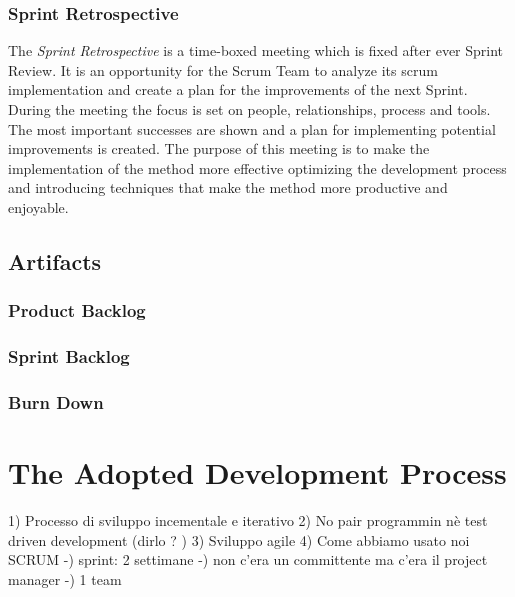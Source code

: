 			\subsubsection{Sprint Retrospective}
			The \emph{Sprint Retrospective} is a time-boxed meeting which is fixed after ever Sprint Review. It is an opportunity for the Scrum Team to analyze its scrum implementation and create a plan for the improvements of the next Sprint. 
			During the meeting the focus is set on people, relationships, process and tools. The most important successes are shown and a plan for implementing potential improvements is created. 
			The purpose of this meeting is to make the implementation of the method more effective optimizing the development process and introducing techniques that make the method more productive and enjoyable. 

		
		\subsection{Artifacts}
			\subsubsection{Product Backlog}
			\subsubsection{Sprint Backlog}
			\subsubsection{Burn Down}
			
	
	
	\section{The Adopted Development Process}
		1) Processo di sviluppo incementale e iterativo
		2) No pair programmin nè test driven development  (dirlo ? )
		3) Sviluppo agile
		4) Come abbiamo usato noi SCRUM
			-) sprint: 2 settimane
			-) non c'era un committente ma c'era il project manager
			-) 1 team


